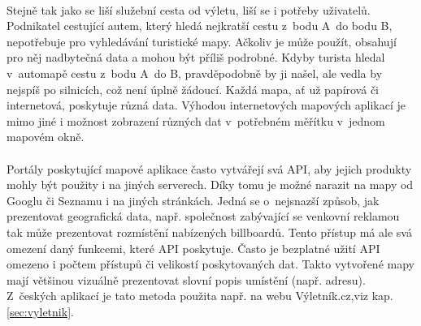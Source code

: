 \documentclass[11pt,a4paper,titlepage,oneside]{book}
\begin{document}
	\paragraph{} Stejně tak jako se liší služební cesta od výletu, liší se i potřeby uživatelů. Podnikatel cestující autem, který hledá nejkratší cestu z~bodu A~do bodu B, nepotřebuje pro vyhledávání turistické mapy. Ačkoliv je může použít, obsahují pro něj nadbytečná data a mohou být příliš podrobné. Kdyby turista hledal v~automapě cestu z~bodu A~do B, pravděpodobně by ji našel, ale vedla by nejspíš po silnicích, což není úplně žádoucí. Každá mapa, ať už papírová či internetová, poskytuje různá data. Výhodou internetových mapových aplikací je mimo jiné i možnost zobrazení různých dat v~potřebném měřítku v~jednom mapovém okně.





	\paragraph{} Portály poskytující mapové aplikace často vytvářejí svá \ac{API}, aby jejich produkty mohly být použity i na jiných serverech. Díky tomu je možné narazit na mapy od Googlu či Seznamu i na jiných stránkách. Jedná se o~nejsnazší způsob, jak prezentovat geografická data, např. společnost zabývající se venkovní reklamou tak může prezentovat rozmístění nabízených billboardů. Tento přístup má ale svá omezení daný funkcemi, které \ac{API} poskytuje. Často je bezplatné užití \ac{API} omezeno i počtem přístupů či velikostí poskytovaných dat. Takto vytvořené mapy mají většinou vizuálně prezentovat slovní popis umístění (např. adresu). Z~českých aplikací je tato metoda použita např. na webu Výletník.cz,viz kap. \ref{sec:vyletnik}.
\end{document}
